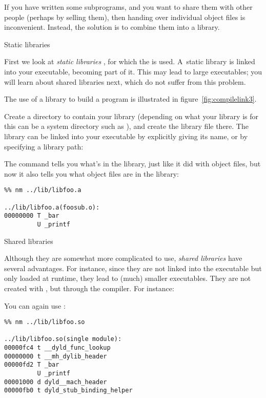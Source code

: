 If you have written some subprograms, and you want to share them with
other people (perhaps by selling them), then handing over individual
object files is inconvenient. Instead, the solution is to combine them
into a library.

 {Static libraries}

First we look at
\emph{static libraries}%
,
for
which the   is used. A~static library
is linked into your executable, becoming part of it. This may lead to
large executables; you will learn about shared libraries
next, which do not suffer from this problem.

The use of a library to build a program is illustrated
in figure~\ref{fig:compilelink3}.

Create a directory to contain your library (depending on what your
library is for this can be a
system directory such as ), and create the library file
there. 
The library can be linked into your executable by explicitly giving
its name, or by specifying a library path:



The  command tells you what's in the library, just
like it did with object files, but now it also tells you what object
files are in the library:
\begin{verbatim}
%% nm ../lib/libfoo.a 

../lib/libfoo.a(foosub.o):
00000000 T _bar
         U _printf
\end{verbatim}


 {Shared libraries}

Although they are somewhat more complicated to use, 
\emph{shared libraries}%
have several advantages. For
instance, since they are not linked into the executable but only
loaded at runtime, they lead to (much) smaller executables. They are
not created with , but through the compiler. For instance:


You can again use :
\begin{verbatim}
%% nm ../lib/libfoo.so 

../lib/libfoo.so(single module):
00000fc4 t __dyld_func_lookup
00000000 t __mh_dylib_header
00000fd2 T _bar
         U _printf
00001000 d dyld__mach_header
00000fb0 t dyld_stub_binding_helper
\end{verbatim}

